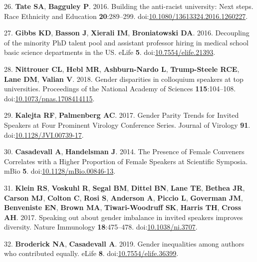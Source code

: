\documentclass[10pt,]{article}
\begin{document}
\hypertarget{ref-Tate2016}{}
26. \textbf{Tate SA}, \textbf{Bagguley P}. 2016. Building the
anti-racist university: Next steps. Race Ethnicity and Education
\textbf{20}:289--299.
doi:\href{https://doi.org/10.1080/13613324.2016.1260227}{10.1080/13613324.2016.1260227}.

\hypertarget{ref-Gibbs2016}{}
27. \textbf{Gibbs KD}, \textbf{Basson J}, \textbf{Xierali IM},
\textbf{Broniatowski DA}. 2016. Decoupling of the minority PhD talent
pool and assistant professor hiring in medical school basic science
departments in the US. eLife \textbf{5}.
doi:\href{https://doi.org/10.7554/elife.21393}{10.7554/elife.21393}.

\hypertarget{ref-nittrouer_gender_2018}{}
28. \textbf{Nittrouer CL}, \textbf{Hebl MR}, \textbf{Ashburn-Nardo L},
\textbf{Trump-Steele RCE}, \textbf{Lane DM}, \textbf{Valian V}. 2018.
Gender disparities in colloquium speakers at top universities.
Proceedings of the National Academy of Sciences \textbf{115}:104--108.
doi:\href{https://doi.org/10.1073/pnas.1708414115}{10.1073/pnas.1708414115}.

\hypertarget{ref-kalejta_gender_2017}{}
29. \textbf{Kalejta RF}, \textbf{Palmenberg AC}. 2017. Gender Parity
Trends for Invited Speakers at Four Prominent Virology Conference
Series. Journal of Virology \textbf{91}.
doi:\href{https://doi.org/10.1128/JVI.00739-17}{10.1128/JVI.00739-17}.

\hypertarget{ref-casadevall_presence_2014}{}
30. \textbf{Casadevall A}, \textbf{Handelsman J}. 2014. The Presence of
Female Conveners Correlates with a Higher Proportion of Female Speakers
at Scientific Symposia. mBio \textbf{5}.
doi:\href{https://doi.org/10.1128/mBio.00846-13}{10.1128/mBio.00846-13}.

\hypertarget{ref-klein_speaking_2017}{}
31. \textbf{Klein RS}, \textbf{Voskuhl R}, \textbf{Segal BM},
\textbf{Dittel BN}, \textbf{Lane TE}, \textbf{Bethea JR}, \textbf{Carson
MJ}, \textbf{Colton C}, \textbf{Rosi S}, \textbf{Anderson A},
\textbf{Piccio L}, \textbf{Goverman JM}, \textbf{Benveniste EN},
\textbf{Brown MA}, \textbf{Tiwari-Woodruff SK}, \textbf{Harris TH},
\textbf{Cross AH}. 2017. Speaking out about gender imbalance in invited
speakers improves diversity. Nature Immunology \textbf{18}:475--478.
doi:\href{https://doi.org/10.1038/ni.3707}{10.1038/ni.3707}.

\hypertarget{ref-Broderick2019}{}
32. \textbf{Broderick NA}, \textbf{Casadevall A}. 2019. Gender
inequalities among authors who contributed equally. eLife \textbf{8}.
doi:\href{https://doi.org/10.7554/elife.36399}{10.7554/elife.36399}.
\end{document}
